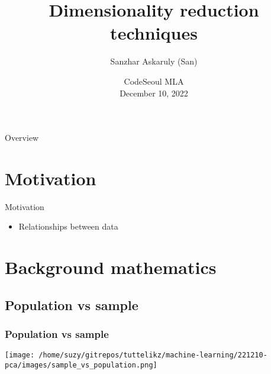 \documentclass{beamer}
\title[CodeSeoul] %
  {Dimensionality reduction techniques}
\author[Machine Learning Afternoons] %
  {Sanzhar Askaruly (San)}
\institute[] %
  { Ulsan National Institute of Science and Technology\newline
    Ph.D. Candidate in Biomedical Engineering}
\date[December 10]
{CodeSeoul MLA \\December 10, 2022}
\begin{document}
    \begin{frame}
    \titlepage %
    \end{frame}

    \begin{frame}{Overview}
      \tableofcontents
    \end{frame}
    
    \section{Motivation} %
    \begin{frame}{Motivation}
        \begin{itemize}
            \item Relationships between data
        \end{itemize}
    \end{frame}

    \section{Background mathematics}
    \subsection{Population vs sample}
    \begin{frame}
        \frametitle{Population vs sample}
        \begin{center}
            \texttt{[image: /home/suzy/gitrepos/tuttelikz/machine-learning/221210-pca/images/sample\_vs\_population.png]}
        \end{center}
    \end{frame}
\end{document}
